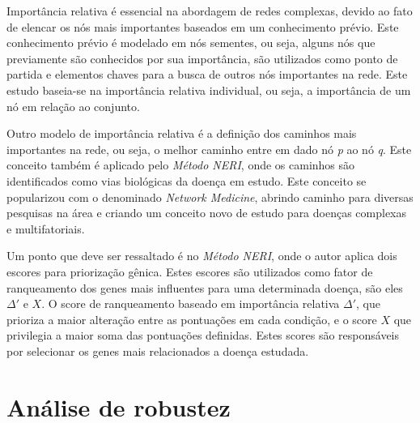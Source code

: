 Importância relativa é essencial na abordagem de redes complexas, devido ao fato de elencar os nós mais importantes baseados em um conhecimento prévio. Este conhecimento prévio é modelado em nós sementes, ou seja, alguns nós que previamente são conhecidos por sua importância, são utilizados como ponto de partida e elementos chaves para a busca de outros nós importantes na rede. Este estudo baseia-se na importância relativa individual, ou seja, a importância de um nó em relação ao conjunto.


%


%
%

Outro modelo de importância relativa é a definição dos caminhos mais importantes na rede, ou seja, o melhor caminho entre em dado nó \textsl{p} ao nó \textsl{q}. Este conceito também é aplicado pelo \textsl{Método NERI}, onde os caminhos são identificados como vias biológicas da doença em estudo. Este conceito se popularizou com o \cite{Barabasi2011} denominado \textsl{Network Medicine}, abrindo caminho para diversas pesquisas na área e criando um conceito novo de estudo para doenças complexas e multifatoriais.
%

Um ponto que deve ser ressaltado é no \textsl{Método NERI}, onde o autor aplica dois escores para priorização gênica. Estes escores são utilizados como fator de ranqueamento dos genes mais influentes para uma determinada doença, são eles $\Delta'$ e $X$. O score de ranqueamento baseado em importância relativa $\Delta'$, que prioriza a maior alteração entre as pontuações em cada condição, e o score $X$ que privilegia a maior soma das pontuações definidas. Estes scores são responsáveis por selecionar os genes mais relacionados a doença estudada.


\section{Análise de robustez}

